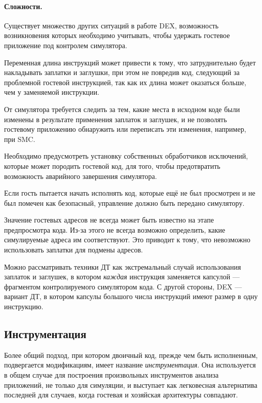 \paragraph{Сложности.} Существует множество других ситуаций в работе DEX, возможность возникновения которых необходимо учитывать, чтобы удержать гостевое приложение под контролем симулятора.

\begin{itemize*}
    \item Переменная длина инструкций может привести к тому, что затруднительно будет накладывать заплатки и заглушки, при этом не повредив код, следующий за проблемной гостевой инструкцией, так как их длина может оказаться больше, чем у заменяемой инструкции.
    \item   От симулятора требуется следить за тем, какие места в исходном коде были изменены в результате применения заплаток и заглушек, и не позволять гостевому приложению обнаружить или переписать эти изменения, например, при SMC.
   \item Необходимо предусмотреть установку собственных обработчиков исключений, которые может породить гостевой код, для того, чтобы предотвратить возможность аварийного завершения симулятора. 
   \item Если гость пытается начать исполнять код, которые ещё не был просмотрен и не был помечен как безопасный, управление должно быть передано симулятору.
   \item Значение гостевых адресов не всегда может быть известно на этапе предпросмотра кода. Из-за этого не всегда возможно определить, какие симулируемые адреса им соответствуют. Это приводит к тому, что невозможно использовать заплатки для подмены адресов.
\end{itemize*}

\begin{digression}
Можно рассматривать техники ДТ как экстремальный случай использования заплаток и заглушек, в котором \emph{каждая} инструкция заменяется капсулой — фрагментом контролируемого симулятором кода. С другой стороны, DEX — вариант ДТ, в котором капсулы большого числа инструкций имеют размер в одну инструкцию.
\end{digression}

\subsection{Инструментация}

Более общий подход, при котором двоичный код, прежде чем быть исполненным, подвергается модификациям, имеет название \textit{инструментация}. Она используется в общем случае для построения произвольных инструментов анализа приложений, не только для симуляции, и выступает как легковесная альтернатива последней для случаев, когда гостевая и хозяйская архитектуры совпадают.

